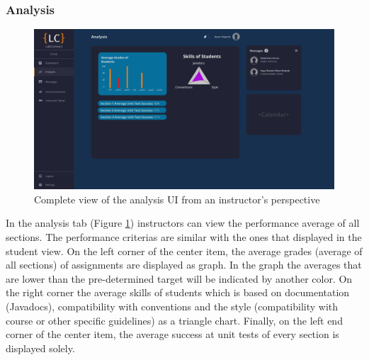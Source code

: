 \documentclass[a4paper, 12pt]{article}
\begin{document}
    
    
    
    
    
    
    
    
    
    
    
    
    \pagebreak
    
    \subsubsection{Analysis}
    
    \begin{figure}[H]
        \centering
        \includegraphics[width=\textwidth]{instructor_analysis}
        \caption{Complete view of the analysis UI from an instructor's perspective}
        \label{fig:instructor_analysis_full}
    \end{figure}

    In the analysis tab (Figure \ref{fig:instructor_analysis_full}) instructors can view the performance average of all sections. The performance criterias are similar with the ones that displayed in the student view.
    On the left corner of the center item, the average grades (average of all sections) of assignments are displayed as graph. In the graph the averages that are lower than the 
    pre-determined target will be indicated by another color. On the right corner the average skills of students which is based on documentation (Javadocs), compatibility with 
    conventions and the style (compatibility with course or other specific guidelines) as a triangle chart. Finally, on the left end corner of the center item, the average 
    success at unit tests of every section is displayed solely. 
    
    
    \pagebreak
    
\end{document}
